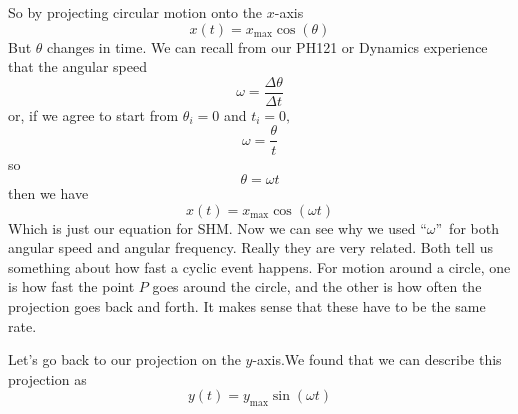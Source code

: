 \documentclass{book}
\begin{document}
So by projecting circular motion onto the $x$-axis 
\begin{equation*}
x\left( t\right) =x_{\max }\cos \left( \theta \right)
\end{equation*}%
But $\theta $ changes in time. We can recall from our PH121 or Dynamics
experience that the angular speed 
\begin{equation*}
\omega =\frac{\Delta \theta }{\Delta t}
\end{equation*}%
or, if we agree to start from $\theta _{i}=0$ and $t_{i}=0,$ 
\begin{equation*}
\omega =\frac{\theta }{t}
\end{equation*}%
so 
\begin{equation*}
\theta =\omega t
\end{equation*}%
then we have 
\begin{equation*}
x\left( t\right) =x_{\max }\cos \left( \omega t\right)
\end{equation*}%
Which is just our equation for SHM. Now we can see why we used
\textquotedblleft $\omega $\textquotedblright\ for both angular speed and
angular frequency. Really they are very related. Both tell us something
about how fast a cyclic event happens. For motion around a circle, one is
how fast the point $P$ goes around the circle, and the other is how often
the projection goes back and forth. It makes sense that these have to be the
same rate.

Let's go back to our projection on the $y$-axis.We found that we can describe
this projection as 
\begin{equation*}
y\left( t\right) =y_{\max }\sin \left( \omega t\right)
\end{equation*}
\end{document}
